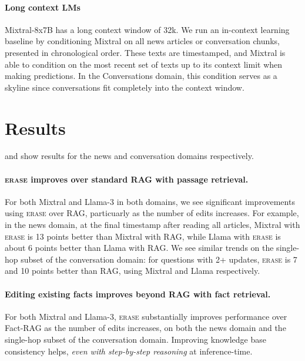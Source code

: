 \documentclass[11pt]{article}
\newcommand{\ourmethod}{\textsc{erase}\xspace}
\begin{document}
\paragraph{Long context LMs} Mixtral-8x7B has a long context window of 32k. 
We run an in-context learning baseline %
by conditioning Mixtral %
on all news articles or conversation chunks, presented in chronological order. These texts are timestamped, and Mixtral is able to condition on the most recent set of texts up to its context limit when making predictions. In the Conversations domain, this condition serves as a skyline since conversations fit completely into the context window.




\section{Results}
\label{sec:results}
 and  show results for the news and conversation domains respectively.

\paragraph{\ourmethod improves over standard RAG with passage retrieval.} For both Mixtral and Llama-3 in both domains, we see significant improvements using \ourmethod over RAG, particuarly as the number of edits increases. For example, in the news domain, at the final timestamp after reading all articles, Mixtral with \ourmethod is 13 points better than Mixtral with RAG, while Llama with \ourmethod is about 6 points better than Llama with RAG.
We see similar trends on the single-hop subset of the conversation domain: for questions with 2+ updates, \ourmethod is 7 and 10 points better than RAG, using Mixtral and Llama respectively.

\paragraph{Editing existing facts improves beyond RAG with fact retrieval.}
For both Mixtral and Llama-3, \ourmethod substantially improves performance over Fact-RAG as the number of edits increases, on both the news domain and the single-hop subset of the conversation domain.
Improving knowledge base consistency helps, \textit{even with step-by-step reasoning} at inference-time. %
\end{document}
